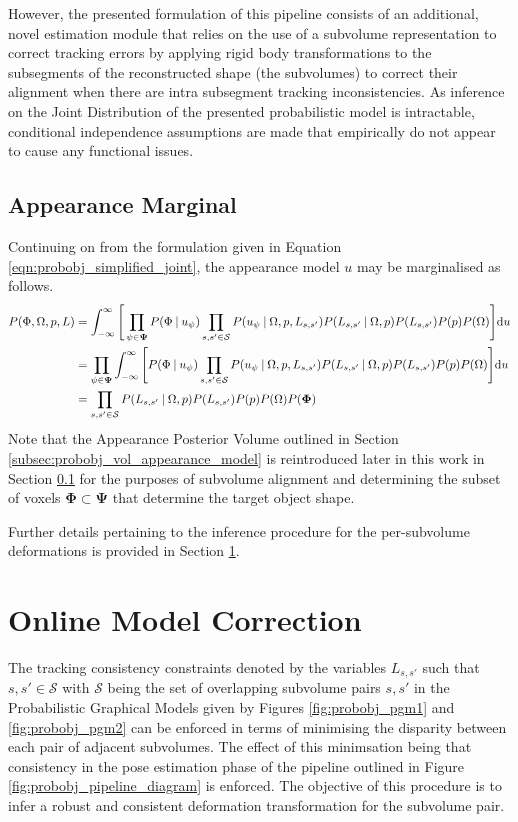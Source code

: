 However, the presented formulation of this pipeline consists of an
additional, novel estimation module that relies on the use of a subvolume
representation to correct tracking errors by applying rigid body transformations
to the subsegments of the reconstructed shape (the subvolumes) to correct their
alignment when there are intra subsegment tracking inconsistencies. As inference
on the Joint Distribution of the presented probabilistic model is intractable, 
conditional independence assumptions are made that empirically do not appear to 
cause any functional issues.

\subsection{Appearance Marginal}
Continuing on from the formulation given in Equation \ref{eqn:probobj_simplified_joint}, 
the appearance model $u$ may be marginalised as follows.
\begin{align}
  \label{eqn:probobj_appearanc_marginal}
  P(\Phi, \Omega, p, L) & =
  \int_{-\infty}^{\infty} \Bigg[ 
  \prod_{\psi \in \mathbf{\Psi}} P(\Phi \:\vert\: u_{\psi})
  \prod_{s, s' \in \mathcal{S}}P(u_{\psi} \:\vert\: \Omega, p, L_{s, s'})
  P(L_{s, s'} \:\vert\: \Omega, p) P(L_{s, s'})P(p)P(\Omega) \Bigg] {\mathrm d{u}} \\
  & = \prod_{\psi \in \mathbf{\Psi}} 
  \int_{-\infty}^{\infty} \Bigg[ P(\Phi \:\vert\: u_{\psi})
  \prod_{s, s' \in \mathcal{S}}P(u_{\psi} \:\vert\: \Omega, p, L_{s, s'})
  P(L_{s, s'} \:\vert\: \Omega, p) P(L_{s, s'})P(p)P(\Omega) \Bigg] {\mathrm d{u}} \\
  & = \prod_{s, s' \in \mathcal{S}} P(L_{s, s'} \:\vert\: \Omega, p)
  P(L_{s, s'})P(p)P(\Omega)P(\mathbf{\Phi})
\end{align}
Note that the Appearance Posterior Volume outlined in Section 
\ref{subsec:probobj_vol_appearance_model} is reintroduced later in this work in
Section \ref{} for the purposes of subvolume alignment and determining the
subset of voxels $\mathbf{\Phi} \subset \mathbf{\Psi}$ that determine the target
object shape.

Further details pertaining to the inference procedure for the per-subvolume
deformations is provided in Section \ref{sec:probobj_model_correction}.

\section{Online Model Correction}
\label{sec:probobj_model_correction}
The tracking consistency constraints denoted by the variables $L_{s, s'}$ such
that $s, s' \in \mathcal{S}$ with $\mathcal{S}$ being the set of overlapping
subvolume pairs $s, s'$ in the Probabilistic Graphical Models given by Figures
\ref{fig:probobj_pgm1} and \ref{fig:probobj_pgm2} can be enforced in terms of
minimising the disparity between each pair of adjacent subvolumes. The effect of
this minimsation being that consistency in the pose estimation phase of the
pipeline outlined in Figure \ref{fig:probobj_pipeline_diagram} is enforced. The
objective of this procedure is to infer a robust and consistent deformation
transformation for the subvolume pair.

